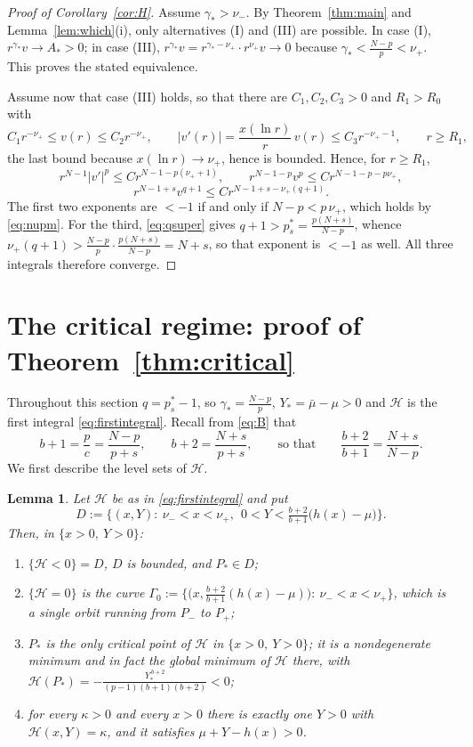 \documentclass[11pt,reqno]{amsart}
\numberwithin{equation}{section}
\theoremstyle{plain}
\newtheorem{lemma}[theorem]{Lemma}
\theoremstyle{definition}
\newcommand{\mub}{\bar\mu}
\newcommand{\gs}{\gamma_{*}}
\begin{document}
\begin{proof}[Proof of Corollary~\ref{cor:H}]
Assume $\gs>\nu_{-}$. By Theorem~\ref{thm:main} and Lemma~\ref{lem:which}(i),
only alternatives (I) and (III) are possible. In case (I),
$r^{\gs}v\to A_{*}>0$; in case (III), $r^{\gs}v=r^{\gs-\nu_{+}}\cdot r^{\nu_{+}}v
\to0$ because $\gs<\frac{N-p}{p}<\nu_{+}$. This proves the stated equivalence.

Assume now that case (III) holds, so that there are $C_{1},C_{2},C_{3}>0$ and
$R_{1}>R_{0}$ with
\[
C_{1}r^{-\nu_{+}}\le v(r)\le C_{2}r^{-\nu_{+}},
\qquad
|v'(r)|=\frac{x(\ln r)}{r}\,v(r)\le C_{3}r^{-\nu_{+}-1},
\qquad r\ge R_{1} ,
\]
the last bound because $x(\ln r)\to\nu_{+}$, hence is bounded. Hence, for $r\ge R_{1}$,
\[
r^{N-1}|v'|^{p}\le C r^{N-1-p(\nu_{+}+1)},\qquad
r^{N-1-p}v^{p}\le Cr^{N-1-p-p\nu_{+}},
\]
\[
r^{N-1+s}v^{q+1}\le Cr^{N-1+s-\nu_{+}(q+1)} .
\]
The first two exponents are $<-1$ if and only if $N-p<p\,\nu_{+}$, which holds
by \eqref{eq:nupm}. For the third, \eqref{eq:qsuper} gives
$q+1>p^{*}_{s}=\frac{p(N+s)}{N-p}$, whence
$\nu_{+}(q+1)>\frac{N-p}{p}\cdot\frac{p(N+s)}{N-p}=N+s$, so that exponent is
$<-1$ as well. All three integrals therefore converge.
\end{proof}


\section{The critical regime: proof of Theorem~\ref{thm:critical}}
\label{sec:critical}

Throughout this section $q=p^{*}_{s}-1$, so $\gs=\frac{N-p}{p}$,
$Y_{*}=\mub-\mu>0$ and $\mathcal H$ is the first integral
\eqref{eq:firstintegral}. Recall from \eqref{eq:B} that
\[
b+1=\frac{p}{c}=\frac{N-p}{p+s},
\qquad
b+2=\frac{N+s}{p+s},
\qquad\text{so that}\qquad
\frac{b+2}{b+1}=\frac{N+s}{N-p} .
\]
We first describe the level sets of $\mathcal H$.

\begin{lemma}\label{lem:levelsets}
Let $\mathcal H$ be as in \eqref{eq:firstintegral} and put
\[
D:=\Big\{(x,Y):\ \nu_{-}<x<\nu_{+},\ \ 0<Y<\tfrac{b+2}{b+1}\big(h(x)-\mu\big)\Big\}.
\]
Then, in $\{x>0,\ Y>0\}$:
\begin{enumerate}
\item[(i)] $\{\mathcal H<0\}=D$, $D$ is bounded, and $P_{*}\in D$;
\item[(ii)] $\{\mathcal H=0\}$ is the curve
$\Gamma_{0}:=\big\{\big(x,\tfrac{b+2}{b+1}(h(x)-\mu)\big):\ \nu_{-}<x<\nu_{+}\big\}$,
which is a single orbit running from $P_{-}$ to $P_{+}$;
\item[(iii)] $P_{*}$ is the only critical point of $\mathcal H$ in
$\{x>0,\ Y>0\}$; it is a nondegenerate minimum and in fact the global minimum of
$\mathcal H$ there, with
$\mathcal H(P_{*})=-\frac{Y_{*}^{\,b+2}}{(p-1)(b+1)(b+2)}<0$;
\item[(iv)] for every $\kappa>0$ and every $x>0$ there is exactly one $Y>0$ with
$\mathcal H(x,Y)=\kappa$, and it satisfies $\mu+Y-h(x)>0$.
\end{enumerate}
\end{lemma}
\end{document}
